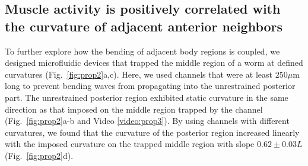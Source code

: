 \subsection{Muscle activity is positively correlated with the curvature of adjacent anterior 
neighbors}
 
To further explore how the bending of adjacent body regions is coupled, we designed 
microfluidic devices that trapped the middle region of a worm at defined curvatures (Fig.~\ref{fig:prop2}a,c). 
Here, we used channels that were at least $250 \mu$m long to prevent bending waves from 
propagating into the unrestrained posterior part. The unrestrained posterior region exhibited 
static curvature in the same direction as that imposed on the middle region trapped by the 
channel (Fig.~\ref{fig:prop2}a-b and Video  \ref{video:prop3}). By using channels with different curvatures, we 
found that the curvature of the posterior region increased linearly with the imposed curvature on 
the trapped middle region with slope $0.62 \pm 0.03 L$ (Fig.~\ref{fig:prop2}d). 



